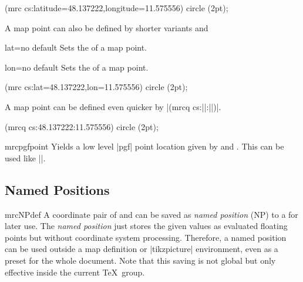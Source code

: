 \begin{dispListing}
  \fill (mrc cs:latitude=48.137222,longitude=11.575556) circle (2pt);
\end{dispListing}

\medskip
A map point can also be defined by shorter variants
 and 

\begin{docMrcKey}[cs]{lat}{=}{no default}
  Sets the  of a map point.
\end{docMrcKey}

\begin{docMrcKey}[cs]{lon}{=}{no default}
  Sets the  of a map point.
\end{docMrcKey}

\begin{dispListing}
  \fill (mrc cs:lat=48.137222,lon=11.575556) circle (2pt);
\end{dispListing}

\medskip
A map point can be defined even quicker by
|(mrcq cs:||:||)|.

\begin{dispListing}
  \fill (mrcq cs:48.137222:11.575556) circle (2pt);
\end{dispListing}

\medskip

\begin{docCommand}{mrcpgfpoint}{}
  Yields a low level |pgf| point location given by
   and .
  This can be used like |\pgfpoint|.
  \begin{dispListing}
  \end{dispListing}
\end{docCommand}




\clearpage
\subsection{Named Positions}\label{sec:names_positions}


\begin{docCommand}{mrcNPdef}{}
  A coordinate pair of  and 
  can be saved as \emph{named position} (NP) to a  for later use.
  The \emph{named position} just stores the given values as evaluated
  floating points but without coordinate system processing.
  Therefore, a named position can be used outside a map definition
  or |tikzpicture| environment, even as a preset for the whole document.
  Note that this saving is not global but only effective inside the
  current \TeX\ group.
  \begin{dispListing}
  \end{dispListing}
\end{docCommand}


